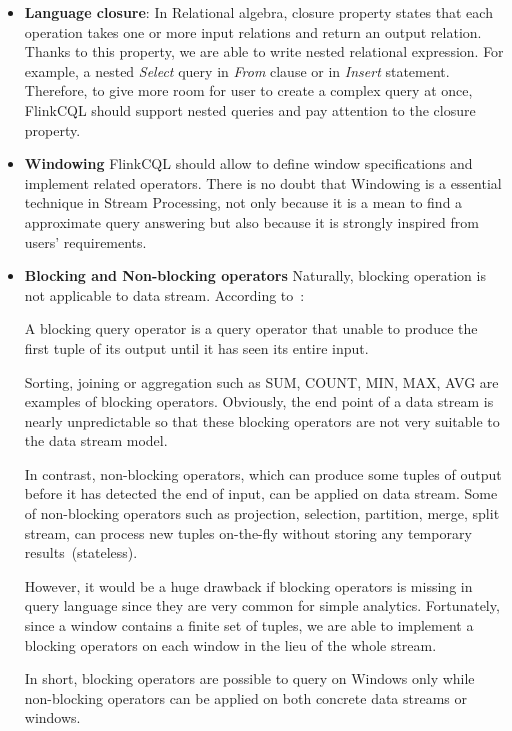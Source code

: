 \begin{itemize}
	\item \textbf{Language closure}: In Relational algebra, closure property states that each operation takes one or more input relations and return an output relation. Thanks to this property, we are able to write nested relational expression. For example, a nested \textit{Select} query in \textit{From} clause or in \textit{Insert} statement. 
	Therefore, to give more room for user to create a complex query at once, FlinkCQL should support nested queries and pay attention to the closure property. 
	
	\item \textbf{Windowing} FlinkCQL should allow to define window specifications and  implement related operators. There is no doubt that Windowing is a essential technique in Stream Processing, not only because it is a mean to find a approximate query answering but also because it is strongly inspired from users' requirements. 
	
	\item \textbf{Blocking and Non-blocking operators} Naturally, blocking operation is not applicable to data stream.  According to~\citep{Babcock:2002}:
	\begin{defi}
		A blocking query operator is a query operator that unable to produce the first tuple of its output until it has seen its entire input.
	\end{defi} 

Sorting, joining or aggregation such as SUM, COUNT, MIN, MAX, AVG are examples of blocking operators. Obviously, the end point of a data stream is nearly unpredictable so that these blocking operators are not very suitable to the data stream model. 

In contrast, non-blocking operators, which can produce some tuples of output before it has detected the end of input, can be applied on data stream. Some of non-blocking operators such as projection, selection, partition, merge, split stream, can process new tuples on-the-fly without storing any temporary results~(stateless).

However, it would be a huge drawback if blocking operators is missing in query language since they are very common for simple analytics. Fortunately, since a window contains a finite set of tuples, we are able to implement a blocking operators on each window in the lieu of the whole stream. 

In short, blocking operators are possible to query on Windows only  while non-blocking operators can be applied on both concrete data streams or windows. 
	
\end{itemize}

